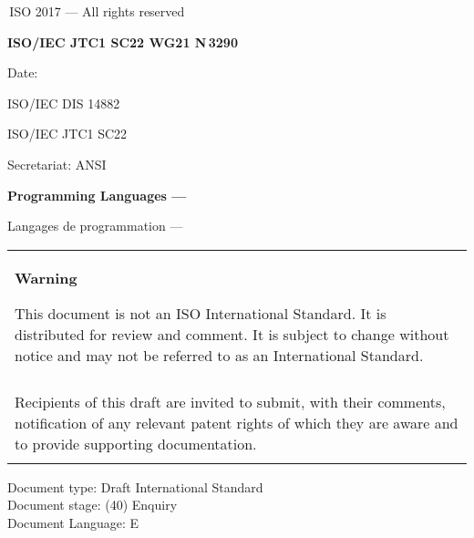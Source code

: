 

\thispagestyle{empty}
{\raisebox{.35ex}{\smaller\copyright}}\,ISO 2017 --- All rights reserved
\vspace{2ex}

\begin{flushright}
\textbf{ISO/IEC JTC1 SC22 WG21 N\,\LARGE3290}

Date: \reldate

ISO/IEC DIS 14882

ISO/IEC JTC1 SC22

Secretariat: ANSI

\end{flushright}

\vfill

\textbf{\LARGE Programming Languages --- \Cpp}

Langages de programmation --- \Cpp

\vfill

\begin{tabular}{|p{\hsize}|}
\hline
\begin{center}
\textbf{Warning}
\end{center}

\vspace{2ex}

This document is not an ISO International Standard. It is distributed
for review and comment. It is subject to change without notice and may
not be referred to as an International Standard.\\\\

Recipients of this draft are invited to submit, with their comments,
notification of any relevant patent rights of which they are aware
and to provide supporting documentation.\\\\
\hline
\end{tabular}

\vfill
\noindent
Document type: Draft International Standard\\
Document stage: (40) Enquiry\\
Document Language: E
\pagebreak

\thispagestyle{cpppage}

